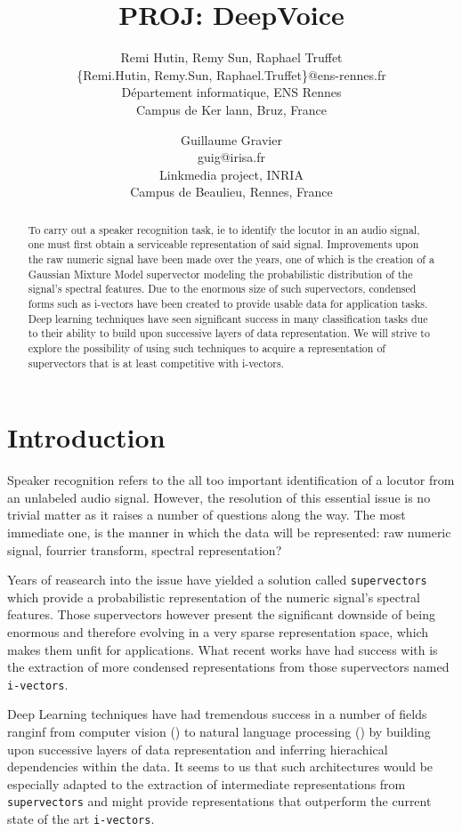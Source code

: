 \documentclass[conference]{IEEEtran}
\title{PROJ: DeepVoice}
\author{Remi Hutin, Remy Sun, Raphael Truffet \\
  \{Remi.Hutin, Remy.Sun, Raphael.Truffet\}@ens-rennes.fr \\
  Département informatique, ENS Rennes \\
  Campus de Ker lann, Bruz, France
\and
  Guillaume Gravier \\
  guig@irisa.fr\\
  Linkmedia project, INRIA \\
  Campus de Beaulieu, Rennes, France
 }
\begin{document}
\maketitle

\begin{abstract}
  To carry out a speaker recognition task, ie to identify the locutor in an
audio signal, one must first obtain a serviceable representation
of said signal. Improvements upon the raw numeric signal have been made over the years, one
of which is the creation of a Gaussian Mixture Model supervector modeling the
probabilistic distribution of the signal's
spectral features. Due to the enormous size of such supervectors, condensed
forms such as i-vectors have been created to provide usable data for application
tasks. Deep learning techniques have seen significant success in many
classification tasks due to their ability to
build upon successive layers of data representation. We will
strive to explore the possibility of using such techniques to acquire a
representation of supervectors that is at least competitive with i-vectors.
\end{abstract}

\section{Introduction}

Speaker recognition refers to the all too important identification of a locutor
from an unlabeled audio signal. However, the resolution of this essential issue
is no trivial matter as it raises a number of questions along the way. The most
immediate one, is the manner in which the data will be represented: raw numeric
signal, fourrier transform, spectral representation? 

Years of reasearch into the issue have yielded a solution called
\texttt{supervectors} which provide a probabilistic representation of the
numeric signal's spectral features. Those supervectors however present the
significant downside of being enormous and therefore evolving in a very sparse
representation space, which makes them unfit for applications. What recent works
have had success with is the extraction of more condensed representations from
those supervectors named \texttt{i-vectors}.

Deep Learning techniques have had tremendous success in a number of fields
ranginf from computer vision (\cite{lecun1998gradient}) to natural language
processing (\cite{bordes2012joint}) by building upon successive layers of data
representation and inferring hierachical dependencies within the data. It seems
to us that such architectures would be especially adapted to the extraction of
intermediate representations from \texttt{supervectors} and might provide
representations that outperform the current state of the art \texttt{i-vectors}.
\end{document}
